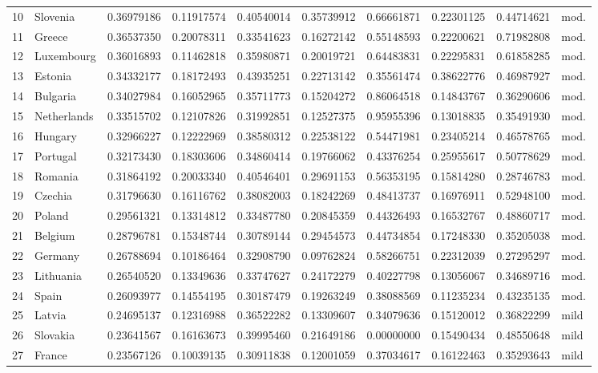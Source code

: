 {\begin{longtable}{@{}r l S[table-format=1.8] S[table-format=1.8]
  S[table-format=1.8] S[table-format=1.8] S[table-format=1.8]
  S[table-format=1.8] S[table-format=1.8] l@{}}
  10 & Slovenia     & 0.36979186 & 0.11917574 & 0.40540014 & 0.35739912 & 0.66661871 & 0.22301125 & 0.44714621 & mod.      \\
  11 & Greece       & 0.36537350 & 0.20078311 & 0.33541623 & 0.16272142 & 0.55148593 & 0.22200621 & 0.71982808 & mod.      \\
  12 & Luxembourg   & 0.36016893 & 0.11462818 & 0.35980871 & 0.20019721 & 0.64483831 & 0.22295831 & 0.61858285 & mod.      \\
  13 & Estonia      & 0.34332177 & 0.18172493 & 0.43935251 & 0.22713142 & 0.35561474 & 0.38622776 & 0.46987927 & mod.      \\
  14 & Bulgaria     & 0.34027984 & 0.16052965 & 0.35711773 & 0.15204272 & 0.86064518 & 0.14843767 & 0.36290606 & mod.      \\
  15 & Netherlands  & 0.33515702 & 0.12107826 & 0.31992851 & 0.12527375 & 0.95955396 & 0.13018835 & 0.35491930 & mod.      \\
  16 & Hungary      & 0.32966227 & 0.12222969 & 0.38580312 & 0.22538122 & 0.54471981 & 0.23405214 & 0.46578765 & mod.      \\
  17 & Portugal     & 0.32173430 & 0.18303606 & 0.34860414 & 0.19766062 & 0.43376254 & 0.25955617 & 0.50778629 & mod.      \\
  18 & Romania      & 0.31864192 & 0.20033340 & 0.40546401 & 0.29691153 & 0.56353195 & 0.15814280 & 0.28746783 & mod.      \\
  19 & Czechia      & 0.31796630 & 0.16116762 & 0.38082003 & 0.18242269 & 0.48413737 & 0.16976911 & 0.52948100 & mod.      \\
  20 & Poland       & 0.29561321 & 0.13314812 & 0.33487780 & 0.20845359 & 0.44326493 & 0.16532767 & 0.48860717 & mod.      \\
  21 & Belgium      & 0.28796781 & 0.15348744 & 0.30789144 & 0.29454573 & 0.44734854 & 0.17248330 & 0.35205038 & mod.      \\
  22 & Germany      & 0.26788694 & 0.10186464 & 0.32908790 & 0.09762824 & 0.58266751 & 0.22312039 & 0.27295297 & mod.      \\
  23 & Lithuania    & 0.26540520 & 0.13349636 & 0.33747627 & 0.24172279 & 0.40227798 & 0.13056067 & 0.34689716 & mod.      \\
  24 & Spain        & 0.26093977 & 0.14554195 & 0.30187479 & 0.19263249 & 0.38088569 & 0.11235234 & 0.43235135 & mod.      \\
  25 & Latvia       & 0.24695137 & 0.12316988 & 0.36522282 & 0.13309607 & 0.34079636 & 0.15120012 & 0.36822299 & mild      \\
  26 & Slovakia     & 0.23641567 & 0.16163673 & 0.39995460 & 0.21649186 & 0.00000000 & 0.15490434 & 0.48550648 & mild      \\
  27 & France       & 0.23567126 & 0.10039135 & 0.30911838 & 0.12001059 & 0.37034617 & 0.16122463 & 0.35293643 & mild      \\
\end{longtable}
}

